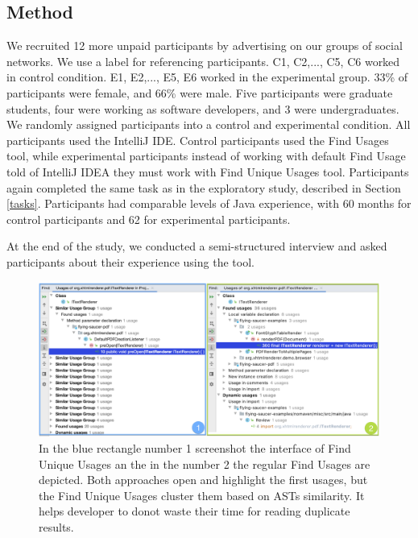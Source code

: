 \documentclass[conference]{IEEEtran}
\begin{document}
\subsection{Method}

We recruited 12 more unpaid participants by advertising on our groups of social networks. We use a label for referencing participants. C1, C2,..., C5, C6 worked in control condition. E1, E2,..., E5, E6 worked in the experimental group. 33\% of participants were female, and 66\% were male. Five participants were graduate students, four were working as software developers, and 3 were undergraduates. We randomly assigned participants into a control and experimental condition. All participants used the IntelliJ IDE. Control participants used the Find Usages tool, while experimental participants instead of working with default Find Usage told of IntelliJ IDEA they must work with Find Unique Usages tool. 
Participants again completed the same task as in the exploratory study, described in Section \ref{tasks}. Participants had comparable levels of Java experience, with 60 months for control participants and 62 for experimental participants.\par 
At the end of the study, we conducted a semi-structured interview and asked participants about their experience using the tool.

\begin{figure}[h]
    \centering
    \includegraphics [width=\textwidth,keepaspectratio,clip]{figures/compare}
    \caption{In the blue rectangle number 1 screenshot the interface of Find Unique Usages an the in the number 2 the regular Find Usages are depicted. Both approaches open and highlight the first usages, but the Find Unique Usages cluster them based on ASTs similarity. It helps developer to donot waste their time for reading duplicate results.  }
\label{fig:compare}
\end{figure}
\end{document}
